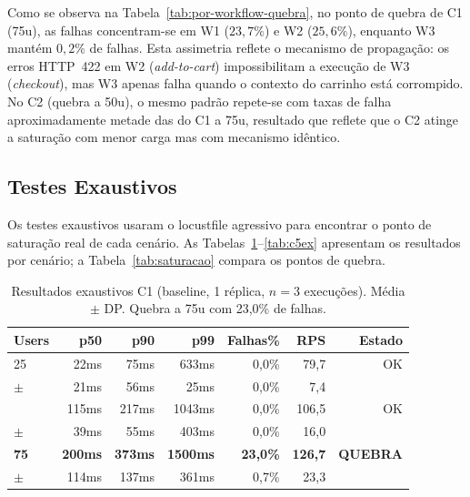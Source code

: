 \documentclass[manuscript,oneside]{acmart}
\begin{document}
Como se observa na Tabela~\ref{tab:por-workflow-quebra}, no ponto de quebra de C1 (75u), as falhas concentram-se em W1 ($23{,}7\%$) e W2 ($25{,}6\%$), enquanto W3 mantém $0{,}2\%$ de falhas. Esta assimetria reflete o mecanismo de propagação: os erros HTTP~422 em W2 (\textit{add-to-cart}) impossibilitam a execução de W3 (\textit{checkout}), mas W3 apenas falha quando o contexto do carrinho está corrompido. No C2 (quebra a 50u), o mesmo padrão repete-se com taxas de falha aproximadamente metade das do C1 a 75u, resultado que reflete que o C2 atinge a saturação com menor carga mas com mecanismo idêntico.

\subsection{Testes Exaustivos}
\label{sec:exaustivos}

Os testes exaustivos usaram o locustfile agressivo para encontrar o ponto de saturação real de cada cenário. As Tabelas~\ref{tab:c1ex}--\ref{tab:c5ex} apresentam os resultados por cenário; a Tabela~\ref{tab:saturacao} compara os pontos de quebra.

\begin{table}[H]
\caption{Resultados exaustivos C1 (baseline, 1 réplica, $n=3$ execuções). Média $\pm$ DP. Quebra a 75u com 23,0\% de falhas.}
\label{tab:c1ex}
\begin{tabular}{lrrrrrr}
\toprule
\textbf{Users} & \textbf{p50} & \textbf{p90} & \textbf{p99} & \textbf{Falhas\%} & \textbf{RPS} & \textbf{Estado} \\
\midrule
25 & 22ms & 75ms & 633ms & 0,0\% & 79,7 & OK \\
{\scriptsize$\pm$} & {\scriptsize21ms} & {\scriptsize56ms} & {\scriptsize25ms} & {\scriptsize0,0\%} & {\scriptsize7,4} & \\[-4pt]
\addlinespace[2pt]
50 & 115ms & 217ms & 1043ms & 0,0\% & 106,5 & OK \\
{\scriptsize$\pm$} & {\scriptsize39ms} & {\scriptsize55ms} & {\scriptsize403ms} & {\scriptsize0,0\%} & {\scriptsize16,0} & \\[-4pt]
\addlinespace[2pt]
\textbf{75} & \textbf{200ms} & \textbf{373ms} & \textbf{1500ms} & \textbf{23,0\%} & \textbf{126,7} & \textbf{QUEBRA} \\
{\scriptsize$\pm$} & {\scriptsize114ms} & {\scriptsize137ms} & {\scriptsize361ms} & {\scriptsize0,7\%} & {\scriptsize23,3} & \\[-4pt]
\bottomrule
\end{tabular}
\end{table}
\end{document}
